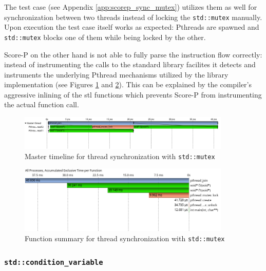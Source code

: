 The test case (see Appendix \ref{app:scorep_sync_mutex}) utilizes them as well for synchronization between two threads instead of locking the \texttt{std::mutex} manually. Upon execution the test case itself works as expected: Pthreads are spawned and \texttt{std::mutex} blocks one of them while being locked by the other.

Score-P on the other hand is not able to fully parse the instruction flow correctly: instead of instrumenting the calls to the standard library facilites it detects and instruments the underlying  Pthread mechanisms utilized by the library implementation (see Figures \ref{scorep:sync_pthread_mutex_timeline} and \ref{scorep:sync_pthread_mutex_summary}). This can be explained by the compiler's aggressive inlining of the \gls{stl} functions which prevents Score-P from instrumenting the actual function call.

\begin{figure}[htbp]
	\begin{center}
		\includegraphics[width=0.9\textwidth]{img/scorep_pthread_mutex_timeline.png}
		\caption{Master timeline for thread synchronization with \texttt{std::mutex}}
		\label{scorep:sync_pthread_mutex_timeline}
	\end{center}
\end{figure}

\begin{figure}[htbp]
	\begin{center}
		\includegraphics[width=0.9\textwidth]{img/scorep_pthread_mutex_summary.png}
		\caption{Function summary for thread synchronization with \texttt{std::mutex}}
		\label{scorep:sync_pthread_mutex_summary}
	\end{center}
\end{figure}

\subsubsection{\texttt{std::condition\_variable}}

